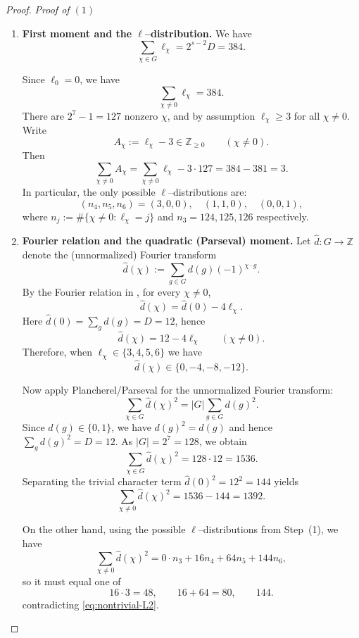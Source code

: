 \documentclass[10pt,a4paper]{amsart}
\begin{document}
\begin{proof}
\noindent\textit{Proof of $(1)$}
\begin{enumerate}
\item \textbf{First moment and the $\ell$--distribution.}
We have
\begin{equation}\label{eq:first-moment}
\sum_{\chi\in G}\ell_\chi = 2^{s-2}D = 384.
\end{equation}

Since $\ell_0=0$, we have
\[
\sum_{\chi\neq 0}\ell_\chi=384.
\]
There are $2^7-1=127$ nonzero $\chi$, and by assumption $\ell_\chi\ge 3$ for all
$\chi\neq 0$. Write
\[
A_\chi := \ell_\chi-3 \in \mathbb Z_{\ge 0}\qquad (\chi\neq 0).
\]
Then
\[
\sum_{\chi\neq 0} A_\chi
=
\sum_{\chi\neq 0}\ell_\chi - 3\cdot 127
=
384-381
=
3.
\]
In particular, the only possible
$\ell$--distributions are:
\[
(n_4,n_5,n_6)=(3,0,0),\quad (1,1,0),\quad (0,0,1),
\]
where $n_j:=\#\{\chi\neq 0:\ell_\chi=j\}$ and $n_3 = 124, 125, 126$ respectively.

\item \textbf{Fourier relation and the quadratic (Parseval) moment.}
Let $\widehat d:G\to \mathbb Z$ denote the (unnormalized) Fourier transform
\[
\widehat d(\chi):=\sum_{g\in G} d(g)(-1)^{\chi\cdot g}.
\]
By the Fourier relation in , for every $\chi\neq 0$,
\begin{equation}\label{eq:fourier-relation}
\widehat d(\chi)=\widehat d(0)-4\ell_\chi.
\end{equation}
Here $\widehat d(0)=\sum_{g} d(g)=D=12$, hence
\[
\widehat d(\chi)=12-4\ell_\chi
\qquad (\chi\neq 0).
\]
Therefore, when $\ell_\chi\in\{3,4,5,6\}$ we have
\[
\widehat d(\chi)\in\{0,-4,-8,-12\}.
\]

Now apply Plancherel/Parseval for the unnormalized Fourier transform:
\[
\sum_{\chi\in G}\widehat d(\chi)^2
=
|G|\sum_{g\in G} d(g)^2.
\]
Since $d(g)\in\{0,1\}$, we have $d(g)^2=d(g)$ and hence $\sum_g d(g)^2=D=12$.
As $|G|=2^7=128$, we obtain
\[
\sum_{\chi\in G}\widehat d(\chi)^2 = 128\cdot 12=1536.
\]
Separating the trivial character term $\widehat d(0)^2=12^2=144$ yields
\begin{equation}\label{eq:nontrivial-L2}
\sum_{\chi\neq 0}\widehat d(\chi)^2 = 1536-144=1392.
\end{equation}

On the other hand, using the possible $\ell$--distributions from Step~(1), we have
\[
\sum_{\chi\neq 0}\widehat d(\chi)^2
=
0\cdot n_3 + 16 n_4 + 64 n_5 + 144 n_6,
\]
so it must equal one of
\[
16\cdot 3=48,\qquad 16+64=80,\qquad 144.
\]
contradicting \eqref{eq:nontrivial-L2}.
\end{enumerate}


\end{proof}
\end{document}
